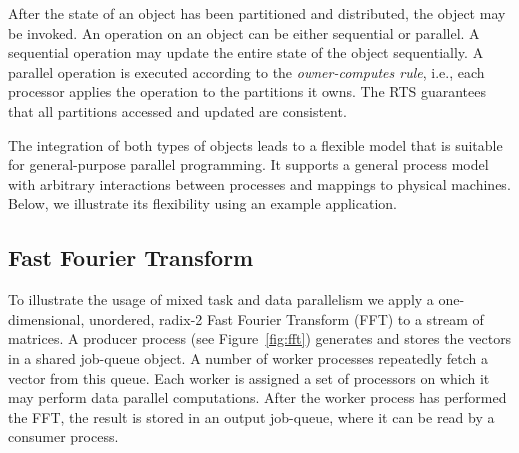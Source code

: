 \documentclass{article}
\begin{document}
After the state of an object has been partitioned and distributed, the
object may be invoked. An operation on an object can be either
sequential or parallel. A sequential operation may update the entire
state of the object sequentially. A parallel operation is executed
according to the \emph{owner-computes rule}, i.e., each processor
applies the operation to the partitions it owns. The RTS guarantees
that all partitions accessed and updated are consistent.

The integration of both types of objects leads to a flexible model
that is suitable for general-purpose parallel programming. It supports
a general process model with arbitrary interactions between processes
and mappings to physical machines. Below, we illustrate its
flexibility using an example application.

\subsection{Fast Fourier Transform}
\label{sec:fft}


To illustrate the usage of mixed task and data parallelism we apply a
one-dimensional, unordered, radix-2 Fast Fourier Transform (FFT) to a
stream of matrices. A producer process (see Figure~\ref{fig:fft})
generates and stores the vectors in a shared job-queue object. A
number of worker processes repeatedly fetch a vector from this queue.
Each worker is assigned a set of processors on which it may perform
data parallel computations. After the worker process has performed the
FFT, the result is stored in an output job-queue, where it can be
read by a consumer process.
\end{document}
